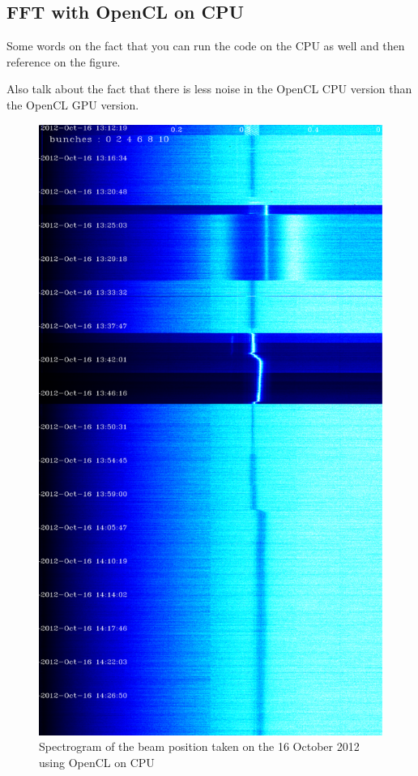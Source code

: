    \subsection{FFT with OpenCL on CPU}

   Some words on the fact that you can run the code on the CPU as well and then reference on the figure.

   Also talk about the fact that there is less noise in the OpenCL CPU version than the OpenCL GPU version.

\begin{figure}
\caption{Spectrogram of the beam position taken on the 16 October 2012 using OpenCL on CPU}
\centering
\includegraphics[scale=0.3]
{md-121016-vb1-m1-6bunches-10acc-cl-cpu-np.pdf}
\end{figure}

